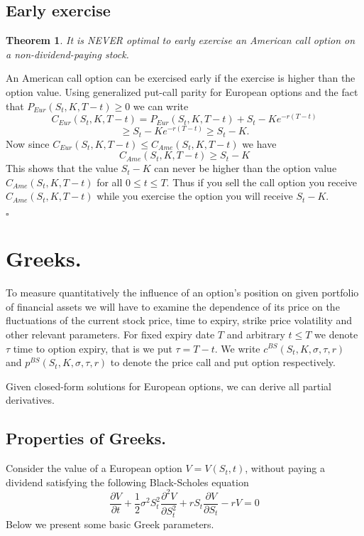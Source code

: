 \documentclass{book}
\newtheorem{theorem}{Theorem}[section]
\newenvironment{proof}
{{\bf Proof. }}{\begin{flushright}$\square$\end{flushright}}
\begin{document}
\subsection{Early exercise}
\begin{theorem}
It is NEVER optimal to early exercise an American call option on a non-dividend-paying
stock.
\end{theorem}
\begin{proof}
An American call option can be exercised early if the exercise is higher than the option value. Using generalized put-call parity for European options and the fact that $P_{Eur}(S_{t},K,T-t)\geq 0$ we can write
$$
C_{Eur}(S_{t},K,T-t)=P_{Eur}(S_{t},K,T-t)+S_{t}-Ke^{-r(T-t)}
$$
$$
\geq S_{t}-Ke^{-r(T-t)}\geq S_{t}-K.
$$
Now since $C_{Eur}(S_{t},K,T-t)\leq C_{Ame}(S_{t},K,T-t)$ we have
$$
C_{Ame}(S_{t},K,T-t)\geq S_{t}-K
$$ 
This shows that the value $S_{t}-K$ can never be higher than the option value $C_{Ame}(S_{t},K,T-t)$ for all $0\leq t\leq T$. Thus if you sell the call option you receive $C_{Ame}(S_{t},K,T-t)$ while you exercise the option you will receive $S_{t}-K.$ 
\end{proof}
\section{Greeks.}
To measure quantitatively the influence of an option's position on given portfolio of financial assets we will have to examine the dependence of its price on the fluctuations of the current stock price, time to expiry, strike price volatility and other relevant parameters. For fixed expiry date $T$ and arbitrary $t\leq T$ we denote $\tau$ time to option expiry, that is we put $\tau=T-t.$ We write $c^{BS}(S_{t},K,\sigma,\tau,r)$ and $p^{BS}(S_{t},K,\sigma,\tau,r)$ to denote the price call and put option respectively.

Given closed-form solutions for European options, we can derive all partial derivatives.
\subsection{Properties of Greeks.}
Consider the value of a European option $V=V(S_{t},t)$, without paying a dividend satisfying the following Black-Scholes equation
$$
\frac{\partial V}{\partial t}+\frac{1}{2}\sigma ^{2}S_{t}^{2}\frac{\partial^{2} V}{\partial S_{t}^{2}}+rS_{t}\frac{\partial V}{\partial S_{t}}-rV=0
$$
Below we present some basic Greek parameters.
\end{document}
